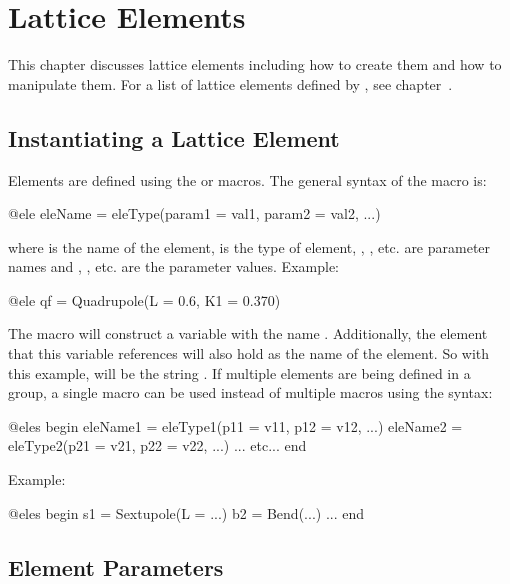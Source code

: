 \chapter{Lattice Elements}
\label{c:ele}

This chapter discusses lattice elements including how to create them and how to manipulate them.
For a list of lattice elements defined by \accellat, see chapter~. 

\section{Instantiating a Lattice Element}
\label{s:ele.def}

Elements are defined using the  or  macros. 
The general syntax of the  macro is:
\begin{example}
  @ele eleName = eleType(param1 = val1, param2 = val2, ...)
\end{example}
where  is the name of the element,  is the type of element, 
, ,
etc. are parameter names and , , etc. are the parameter values.
Example:
\begin{example}
  @ele qf = Quadrupole(L = 0.6, K1 = 0.370)
\end{example}
The  macro will construct a \julia variable with the name . 
Additionally, the element
that this variable references will also hold  as the name of the element. So with this
example,  will be the string . If multiple elements are being defined in a 
group, a single
 macro can be used instead of multiple  macros using the syntax:
\begin{example}
  @eles begin
    eleName1 = eleType1(p11 = v11, p12 = v12, ...)
    eleName2 = eleType2(p21 = v21, p22 = v22, ...)
    ... etc...
  end
\end{example}
Example:
\begin{example}
  @eles begin
    s1 = Sextupole(L = ...)
    b2 = Bend(...)
    ...
  end
\end{example}

\section{Element Parameters}
\label{s:ele.type}

